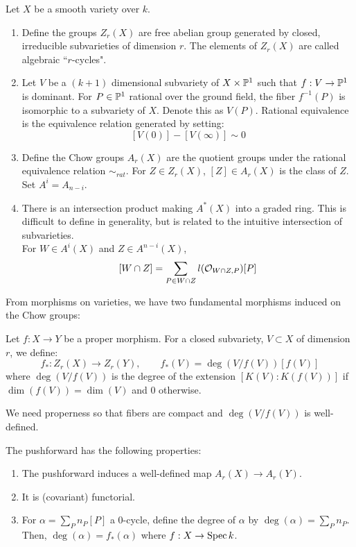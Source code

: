 \documentclass[12pt]{amsart}
\begin{document}
Let $X$ be a smooth variety over $k$. 

\begin{definition}
    \begin{enumerate}
        \item Define the groups $Z_r(X)$ are free abelian group generated by closed, irreducible subvarieties of dimension $r$. The elements of $Z_r(X)$ are called algebraic ``$r$-cycles".
        \item Let $V$ be a $(k+1)$ dimensional subvariety of $X \times \P^1$ such that $f: V \to \P^1$ is dominant. For $P \in \P^1$ rational over the ground field, the fiber $f^{-1}(P)$ is isomorphic to a subvariety of $X$. Denote this as $V(P)$. Rational equivalence is the equivalence relation generated by setting: 
        \[ [V(0)]-[V(\infty)] \sim 0\]        
        \item Define the Chow groups $A_r(X)$ are the quotient groups under the rational equivalence relation $\sim_{rat}$. For $Z \in Z_r(X)$, $[Z] \in A_r(X)$ is the class of $Z$. Set $A^i = A_{n-i}$.
        \item There is an intersection product making $A^*(X)$ into a graded ring. This is difficult to define in generality, but is related to the intuitive intersection of subvarieties. \\
        For $W \in A^i(X)$ and $Z \in A^{n-i}(X)$, 
        \[ [W \cap Z] = \sum_{P \in W \cap Z} l(\OO_{W \cap Z, P})[P] \]
    \end{enumerate}
\end{definition}

From morphisms on varieties, we have two fundamental morphisms induced on the Chow groups:

\begin{definition}
    Let $f: X \to Y$ be a proper morphism. For a closed subvariety, $V \subset X$ of dimension $r$, we define: 
    \[f_*: Z_r(X) \to Z_r(Y), \qquad f_*(V) = \deg(V/f(V))[f(V)] \]
    where $\deg(V/f(V))$ is the degree of the extension $[K(V) : K(f(V))]$ if $\dim(f(V)) = \dim(V)$ and $0$ otherwise.
\end{definition}
\begin{remark}
    We need properness so that fibers are compact and $\deg(V/f(V))$ is well-defined. 
\end{remark}

\begin{theorem}
    The pushforward has the following properties: 
    \begin{enumerate}
        \item The pushforward induces a well-defined map $A_r(X) \to A_r(Y)$.
        \item It is (covariant) functorial.
        \item For $\alpha = \sum_P n_P [P]$ a $0$-cycle, define the degree of $\alpha$ by $\deg(\alpha) = \sum_P n_P$. Then, $\deg(\alpha) = f_*(\alpha)$ where $f: X \to \Spec k$. 
    \end{enumerate}
\end{theorem}
\end{document}
